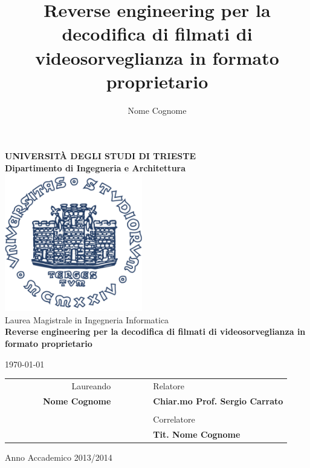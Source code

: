 \title{Reverse engineering per la decodifica di filmati di videosorveglianza in formato proprietario}
\author{Nome Cognome}

\begin{titlepage}
    \begin{center}
    \BgThispage
    {\LARGE {\bfseries UNIVERSIT\`A DEGLI STUDI DI TRIESTE \\}}
    \vspace{.5cm}
    {\Large {\bfseries Dipartimento di Ingegneria e Architettura \\}}
    \vspace{1cm}
    \includegraphics[width=6cm,height=6cm]{img/units_logo.pdf}\\[1.5cm]

    {\LARGE
        Laurea Magistrale in Ingegneria Informatica \\
    }
    \vspace{1cm}
    {\LARGE 
        {\bfseries Reverse engineering per la decodifica di filmati di videosorveglianza in formato proprietario}
    }
    \vspace{1cm}

    {\large \today \\
    }

    \vfill
    \begin{table}[h]
        {\large
            \begin{tabular}{c c c c r c c | c c l}
                & & & & Laureando & & & & & Relatore \\
                & & & & \bfseries Nome Cognome & & & & & \bfseries Chiar.mo Prof. Sergio Carrato \\ %
                & & & & & & & & & \\
                & & & & & & & & & Correlatore \\ %
                & & & & & & & & & \bfseries Tit. Nome Cognome \\ %
            \end{tabular}
        }
    \end{table}
    Anno Accademico 2013/2014
    \end{center}
\end{titlepage}
